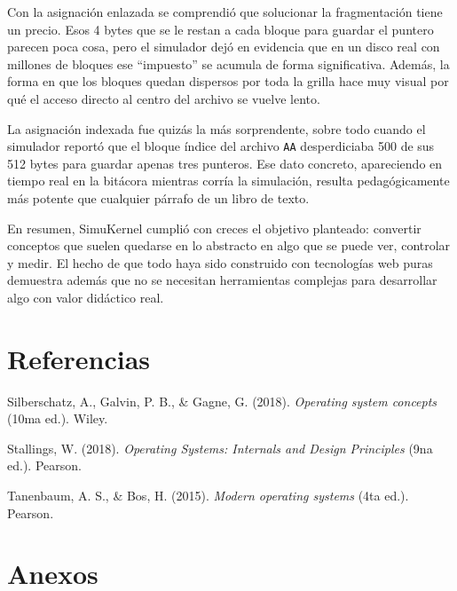 \documentclass[12pt,a4paper]{article}
\begin{document}
Con la asignación enlazada se comprendió que solucionar la fragmentación tiene un precio. Esos 4 bytes que se le restan a cada bloque para guardar el puntero parecen poca cosa, pero el simulador dejó en evidencia que en un disco real con millones de bloques ese ``impuesto'' se acumula de forma significativa. Además, la forma en que los bloques quedan dispersos por toda la grilla hace muy visual por qué el acceso directo al centro del archivo se vuelve lento.

La asignación indexada fue quizás la más sorprendente, sobre todo cuando el simulador reportó que el bloque índice del archivo \texttt{AA} desperdiciaba 500 de sus 512 bytes para guardar apenas tres punteros. Ese dato concreto, apareciendo en tiempo real en la bitácora mientras corría la simulación, resulta pedagógicamente más potente que cualquier párrafo de un libro de texto.

En resumen, SimuKernel cumplió con creces el objetivo planteado: convertir conceptos que suelen quedarse en lo abstracto en algo que se puede ver, controlar y medir. El hecho de que todo haya sido construido con tecnologías web puras demuestra además que no se necesitan herramientas complejas para desarrollar algo con valor didáctico real.

\newpage
\section{Referencias}
\vspace{-0.5cm}
\setlength{\parindent}{0cm}

\noindent
\hangindent=1.27cm
Silberschatz, A., Galvin, P. B., \& Gagne, G. (2018). \textit{Operating system concepts} (10ma ed.). Wiley.

\vspace{0.3cm}
\noindent
\hangindent=1.27cm
Stallings, W. (2018). \textit{Operating Systems: Internals and Design Principles} (9na ed.). Pearson.

\vspace{0.3cm}
\noindent
\hangindent=1.27cm
Tanenbaum, A. S., \& Bos, H. (2015). \textit{Modern operating systems} (4ta ed.). Pearson.

\vspace{1cm}
\setlength{\parindent}{1.27cm}
\section{Anexos}
\end{document}

